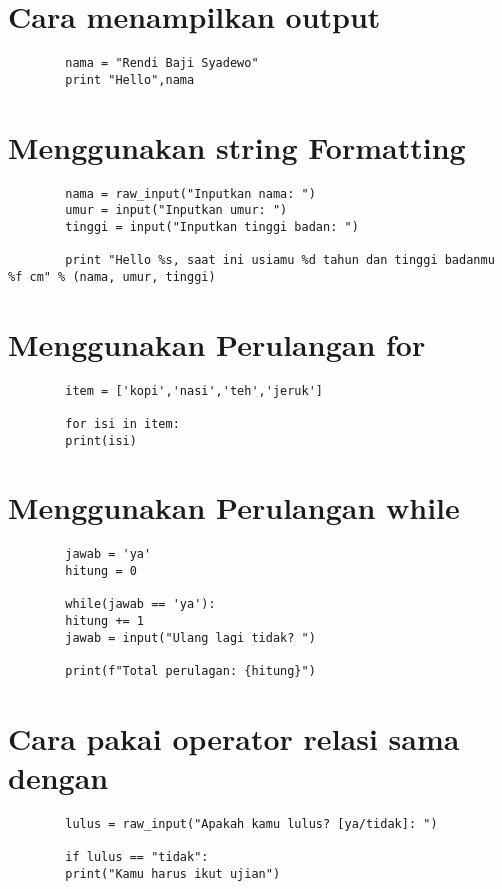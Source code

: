 \documentclass{article}
\begin{document}
	\section{Cara menampilkan output}
	\begin{lstlisting}
		nama = "Rendi Baji Syadewo"
		print "Hello",nama
	\end{lstlisting}
	
	\section{Menggunakan string Formatting}
	\begin{lstlisting}
		nama = raw_input("Inputkan nama: ")
		umur = input("Inputkan umur: ")
		tinggi = input("Inputkan tinggi badan: ")
		
		print "Hello %s, saat ini usiamu %d tahun dan tinggi badanmu %f cm" % (nama, umur, tinggi)
	\end{lstlisting}
	
	\section{Menggunakan Perulangan for}
	\begin{lstlisting}
		item = ['kopi','nasi','teh','jeruk']
		
		for isi in item:
		print(isi)
	\end{lstlisting}
	
	\section{Menggunakan Perulangan while}
	\begin{lstlisting}
		jawab = 'ya'
		hitung = 0
		
		while(jawab == 'ya'):
		hitung += 1
		jawab = input("Ulang lagi tidak? ")
		
		print(f"Total perulagan: {hitung}")
	\end{lstlisting}
	
	\section{Cara pakai operator relasi sama dengan}
	\begin{lstlisting}
		lulus = raw_input("Apakah kamu lulus? [ya/tidak]: ")
		
		if lulus == "tidak":
		print("Kamu harus ikut ujian")
	\end{lstlisting}
	
\end{document}
